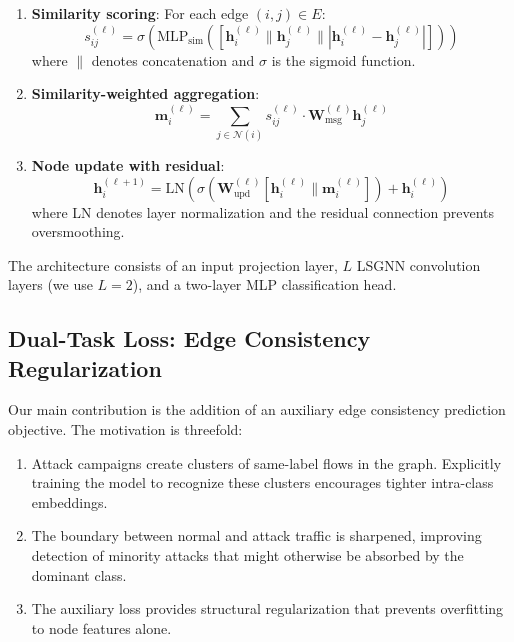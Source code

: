 \documentclass[conference]{IEEEtran}
\begin{document}
\begin{enumerate}
    \item \textbf{Similarity scoring}: For each edge $(i, j) \in E$:
    \begin{equation}
        s_{ij}^{(\ell)} = \sigma\!\left(\text{MLP}_{\text{sim}}\!\left([\mathbf{h}_i^{(\ell)} \| \mathbf{h}_j^{(\ell)} \| |\mathbf{h}_i^{(\ell)} - \mathbf{h}_j^{(\ell)}|]\right)\right)
    \end{equation}
    where $\|$ denotes concatenation and $\sigma$ is the sigmoid function.

    \item \textbf{Similarity-weighted aggregation}:
    \begin{equation}
        \mathbf{m}_i^{(\ell)} = \sum_{j \in \mathcal{N}(i)} s_{ij}^{(\ell)} \cdot \mathbf{W}_{\text{msg}}^{(\ell)} \mathbf{h}_j^{(\ell)}
    \end{equation}

    \item \textbf{Node update with residual}:
    \begin{equation}
        \mathbf{h}_i^{(\ell+1)} = \text{LN}\!\left(\sigma\!\left(\mathbf{W}_{\text{upd}}^{(\ell)} [\mathbf{h}_i^{(\ell)} \| \mathbf{m}_i^{(\ell)}]\right) + \mathbf{h}_i^{(\ell)}\right)
    \end{equation}
    where LN denotes layer normalization and the residual connection prevents oversmoothing.
\end{enumerate}

The architecture consists of an input projection layer, $L$ LSGNN convolution layers (we use $L=2$), and a two-layer MLP classification head.

\subsection{Dual-Task Loss: Edge Consistency Regularization}

Our main contribution is the addition of an auxiliary edge consistency prediction objective. The motivation is threefold:

\begin{enumerate}
    \item Attack campaigns create clusters of same-label flows in the graph. Explicitly training the model to recognize these clusters encourages tighter intra-class embeddings.
    \item The boundary between normal and attack traffic is sharpened, improving detection of minority attacks that might otherwise be absorbed by the dominant class.
    \item The auxiliary loss provides structural regularization that prevents overfitting to node features alone.
\end{enumerate}
\end{document}
